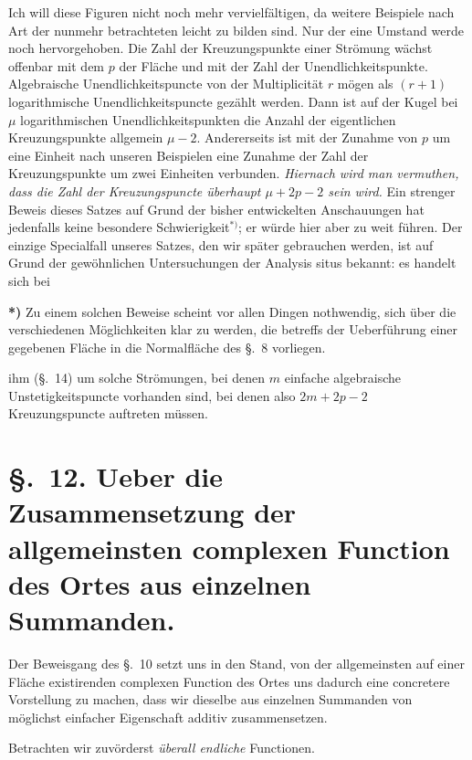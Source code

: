 \documentclass{article}
\begin{document}
Ich will diese Figuren nicht noch mehr vervielfältigen, da weitere Beispiele nach Art der nunmehr betrachteten leicht zu bilden sind. Nur der eine Umstand werde noch hervorgehoben. Die Zahl der Kreuzungspunkte einer Strömung wächst offenbar mit dem $p$ der Fläche und mit der Zahl der Unendlichkeitspunkte. Algebraische Unendlichkeitspuncte von der Multiplicität $r$ mögen als $(r + 1)$ logarithmische Unendlichkeitspuncte gezählt werden. Dann ist auf der Kugel bei $\mu$ logarithmischen Unendlichkeitspunkten die Anzahl der eigentlichen Kreuzungspunkte allgemein $\mu - 2$. Andererseits ist mit der Zunahme von $p$ um eine Einheit nach unseren Beispielen eine Zunahme der Zahl der Kreuzungspunkte um zwei Einheiten verbunden. \emph{Hiernach wird man vermuthen, dass die Zahl der Kreuzungspuncte überhaupt $\mu + 2p - 2$ sein wird.} Ein strenger Beweis dieses Satzes auf Grund der bisher entwickelten Anschauungen hat jedenfalls keine besondere Schwierigkeit${}^{*)}$; er würde hier aber zu weit führen. Der einzige Specialfall unseres Satzes, den wir später gebrauchen werden, ist auf Grund der gewöhnlichen Untersuchungen der Analysis situs bekannt: es handelt sich bei

\textbf{*)} Zu einem solchen Beweise scheint vor allen Dingen nothwendig, sich über die verschiedenen Möglichkeiten klar zu werden, die betreffs der Ueberführung einer gegebenen Fläche in die Normalfläche des §.~8 vorliegen.

ihm (§.~14) um solche Strömungen, bei denen $m$ einfache algebraische Unstetigkeitspuncte vorhanden sind, bei denen also $2m + 2p - 2$ Kreuzungspuncte auftreten müssen.

\section*{§.~12. Ueber die Zusammensetzung der allgemeinsten complexen Function des Ortes aus einzelnen Summanden.}

Der Beweisgang des §.~10 setzt uns in den Stand, von der allgemeinsten auf einer Fläche existirenden complexen Function des Ortes uns dadurch eine concretere Vorstellung zu machen, dass wir dieselbe aus einzelnen Summanden von möglichst einfacher Eigenschaft additiv zusammensetzen.

Betrachten wir zuvörderst \emph{überall endliche} Functionen.
\end{document}
